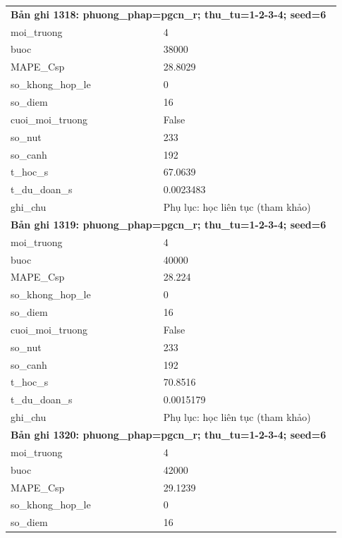 \begin{longtable}{p{0.43\linewidth}p{0.50\linewidth}}
\midrule
\multicolumn{2}{p{0.95\linewidth}}{\textbf{Bản ghi 1318: phuong\_phap=pgcn\_r; thu\_tu=1-2-3-4; seed=6}} \\
moi\_\allowbreak truong & 4 \\
buoc & 38000 \\
MAPE\_\allowbreak Csp & 28.8029 \\
so\_\allowbreak khong\_\allowbreak hop\_\allowbreak le & 0 \\
so\_\allowbreak diem & 16 \\
cuoi\_\allowbreak moi\_\allowbreak truong & False \\
so\_\allowbreak nut & 233 \\
so\_\allowbreak canh & 192 \\
t\_\allowbreak hoc\_\allowbreak s & 67.0639 \\
t\_\allowbreak du\_\allowbreak doan\_\allowbreak s & 0.0023483 \\
ghi\_\allowbreak chu & Phụ lục: học liên tục (tham khảo) \\
\midrule
\multicolumn{2}{p{0.95\linewidth}}{\textbf{Bản ghi 1319: phuong\_phap=pgcn\_r; thu\_tu=1-2-3-4; seed=6}} \\
moi\_\allowbreak truong & 4 \\
buoc & 40000 \\
MAPE\_\allowbreak Csp & 28.224 \\
so\_\allowbreak khong\_\allowbreak hop\_\allowbreak le & 0 \\
so\_\allowbreak diem & 16 \\
cuoi\_\allowbreak moi\_\allowbreak truong & False \\
so\_\allowbreak nut & 233 \\
so\_\allowbreak canh & 192 \\
t\_\allowbreak hoc\_\allowbreak s & 70.8516 \\
t\_\allowbreak du\_\allowbreak doan\_\allowbreak s & 0.0015179 \\
ghi\_\allowbreak chu & Phụ lục: học liên tục (tham khảo) \\
\midrule
\multicolumn{2}{p{0.95\linewidth}}{\textbf{Bản ghi 1320: phuong\_phap=pgcn\_r; thu\_tu=1-2-3-4; seed=6}} \\
moi\_\allowbreak truong & 4 \\
buoc & 42000 \\
MAPE\_\allowbreak Csp & 29.1239 \\
so\_\allowbreak khong\_\allowbreak hop\_\allowbreak le & 0 \\
so\_\allowbreak diem & 16 \\

\end{longtable}
